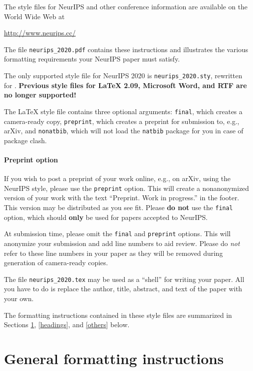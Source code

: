 \documentclass{article}
\begin{document}
The style files for NeurIPS and other conference information are available on
the World Wide Web at
\begin{center}
  \url{http://www.neurips.cc/}
\end{center}
The file \verb+neurips_2020.pdf+ contains these instructions and illustrates the
various formatting requirements your NeurIPS paper must satisfy.

The only supported style file for NeurIPS 2020 is \verb+neurips_2020.sty+,
rewritten for \LaTeXe{}.  \textbf{Previous style files for \LaTeX{} 2.09,
  Microsoft Word, and RTF are no longer supported!}

The \LaTeX{} style file contains three optional arguments: \verb+final+, which
creates a camera-ready copy, \verb+preprint+, which creates a preprint for
submission to, e.g., arXiv, and \verb+nonatbib+, which will not load the
\verb+natbib+ package for you in case of package clash.

\paragraph{Preprint option}
If you wish to post a preprint of your work online, e.g., on arXiv, using the
NeurIPS style, please use the \verb+preprint+ option. This will create a
nonanonymized version of your work with the text ``Preprint. Work in progress.''
in the footer. This version may be distributed as you see fit. Please \textbf{do
  not} use the \verb+final+ option, which should \textbf{only} be used for
papers accepted to NeurIPS.

At submission time, please omit the \verb+final+ and \verb+preprint+
options. This will anonymize your submission and add line numbers to aid
review. Please do \emph{not} refer to these line numbers in your paper as they
will be removed during generation of camera-ready copies.

The file \verb+neurips_2020.tex+ may be used as a ``shell'' for writing your
paper. All you have to do is replace the author, title, abstract, and text of
the paper with your own.

The formatting instructions contained in these style files are summarized in
Sections \ref{gen_inst}, \ref{headings}, and \ref{others} below.

\section{General formatting instructions}
\label{gen_inst}
\end{document}

